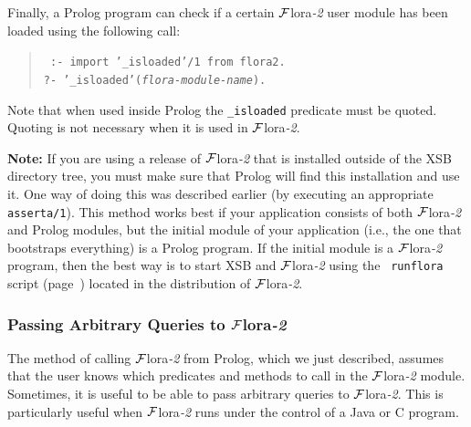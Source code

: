 \documentclass[11pt]{article}
\newcommand{\FLORA}{{\mbox{\sc ${\cal F}${lora}\rm\emph{-2}}}\xspace}
\begin{document}
Finally, a Prolog program can check if a certain \FLORA user module has been
loaded using the following call:
\begin{quote}
 \tt
 :- import '\_isloaded'/1 from flora2.\\
 ?- '\_isloaded'({\it flora-module-name}).
\end{quote}
Note that when used inside Prolog the {\tt \_isloaded} predicate must be
quoted. Quoting is not necessary when it is used in \FLORA. 

{\bf Note:} If you are using a release of \FLORA that is installed
outside of the XSB directory tree, you must make sure that Prolog will find
this installation and use it.
One way of doing this was described
earlier (by executing an appropriate {\tt asserta/1}). This method works
best if your application consists of both \FLORA and Prolog modules, but
the initial module of your application (i.e., the one that bootstraps
everything) is a Prolog program.  If the initial module is a \FLORA
program, then the best way is to start XSB and \FLORA using the {\tt
  runflora} script (page~\pageref{runflora-page}) located in the
distribution of \FLORA.

\subsubsection{Passing Arbitrary Queries to \FLORA}

The method of calling \FLORA from Prolog, which we just described, assumes
that the user knows which predicates and methods to call in the \FLORA
module. Sometimes, it is useful to be able to pass arbitrary queries to
\FLORA. This is particularly useful when \FLORA runs under the control of a
Java or C program.
\end{document}
